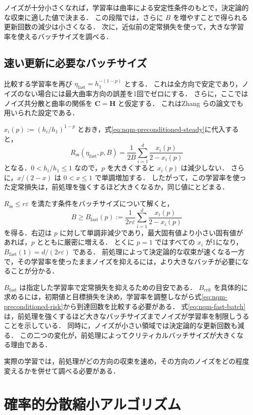 \documentclass[../main.tex]{subfiles}
\begin{document}
ノイズが十分小さくなれば，学習率は曲率による安定性条件のもとで，決定論的な収束に適した値で決まる．
この段階では，さらに $B$ を増やすことで得られる更新回数の減少は小さくなる．
次に，近似前の定常損失を使って，大きな学習率を使えるバッチサイズを調べる．

\subsection{速い更新に必要なバッチサイズ}

比較する学習率を再び $\eta_{\mathrm{fast}}=h_1^{-(1-p)}$ とする．
これは全方向で安定であり，ノイズのない場合には最大曲率方向の誤差を1回でゼロにする．
さらに，ここではノイズ共分散と曲率の関係を $\bm{C}=\bm{H}$ と仮定する．
これはZhang らの論文でも用いられた設定である．

$x_i(p):=(h_i/h_1)^{1-p}$ とおき，式\eqref{eq:nqm-preconditioned-steady}に代入すると，
\begin{equation}
  R_{\mathrm{ss}}(\eta_{\mathrm{fast}},p,B)
  =\frac{1}{2B}\sum_{i=1}^d\frac{x_i(p)}{2-x_i(p)}
  \label{eq:nqm-fast-risk}
\end{equation}
となる．$0<h_i/h_1\leq1$ なので，$p$ を大きくすると $x_i(p)$ は減少しない．
さらに，$x/(2-x)$ は $0<x\leq1$ で単調増加する．
したがって，この学習率を使った定常損失は，前処理を強くするほど大きくなるか，同じ値にとどまる．

$R_{\mathrm{ss}}\leq r\varepsilon$ を満たす条件をバッチサイズについて解くと，
\begin{equation}
  B\geq B_{\mathrm{fast}}(p)
  :=\frac{1}{2r\varepsilon}
  \sum_{i=1}^d\frac{x_i(p)}{2-x_i(p)}
  \label{eq:nqm-fast-batch}
\end{equation}
を得る．右辺は $p$ に対して単調非減少であり，最大固有値より小さい固有値があれば，$p$ とともに厳密に増える．
とくに $p=1$ ではすべての $x_i$ が1になり，$B_{\mathrm{fast}}(1)=d/(2r\varepsilon)$ である．
前処理によって決定論的な収束が速くなる一方で，その学習率を使ったままノイズを抑えるには，より大きなバッチが必要になることが分かる．

$B_{\mathrm{fast}}$ は指定した学習率で定常損失を抑えるための目安である．
$B_{\mathrm{crit}}$ を具体的に求めるには，初期値と目標損失を決め，学習率を調整しながら式\eqref{eq:nqm-preconditioned-risk}から到達回数を比較する必要がある．
式\eqref{eq:nqm-fast-batch}は，前処理を強くするほど大きなバッチサイズまでノイズが学習率を制限しうることを示している．
同時に，ノイズが小さい領域では決定論的な更新回数も減る．
この二つの変化が，前処理によってクリティカルバッチサイズが大きくなる理由である．

実際の学習では，前処理がどの方向の収束を速め，その方向のノイズをどの程度変えるかを併せて調べる必要がある．

\section{確率的分散縮小アルゴリズム}

\chapterbibliography
\end{document}
